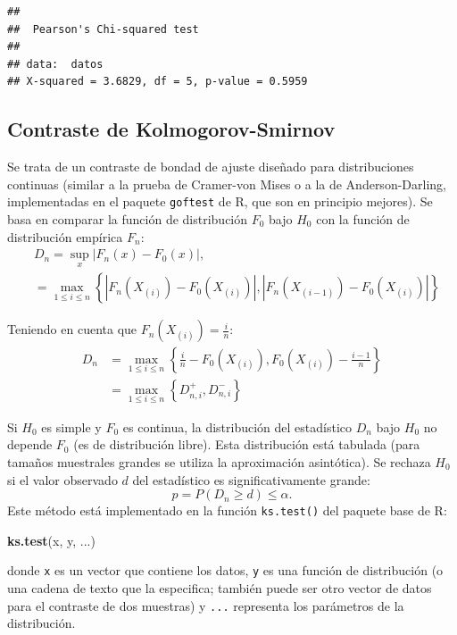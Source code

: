 \documentclass[
]{book}
\newenvironment{Shaded}{\begin{snugshade}}{\end{snugshade}}
\newcommand{\KeywordTok}[1]{\textcolor[rgb]{0.13,0.29,0.53}{\textbf{#1}}}
\newcommand{\NormalTok}[1]{#1}
\theoremstyle{break}
\theoremstyle{definition}
\theoremstyle{definition}
\theoremstyle{definition}
\theoremstyle{remark}
\begin{document}
\begin{verbatim}
## 
##  Pearson's Chi-squared test
## 
## data:  datos
## X-squared = 3.6829, df = 5, p-value = 0.5959
\end{verbatim}

\hypertarget{ks-test}{%
\subsection{Contraste de Kolmogorov-Smirnov}\label{ks-test}}

Se trata de un contraste de bondad de ajuste diseñado para distribuciones continuas
(similar a la prueba de Cramer-von Mises o a la de Anderson-Darling, implementadas en el paquete \texttt{goftest} de R, que son en principio mejores).
Se basa en comparar la función de distribución \(F_0\) bajo \(H_0\) con la función de distribución empírica \(F_n\):
\[\begin{aligned}
& D_n=\sup_{x}|F_n(x)-F_0(x)|,\\
& = \max_{1 \leq i \leq n} \left\{ |F_n(X_{(i)})-F_0(X_{(i)})|,|F_n(X_{(i-1)})-F_0(X_{(i)})| \right\}
\end{aligned}\]

Teniendo en cuenta que \(F_n\left( X_{(i)}\right) = \frac{i}n\):
\[\begin{aligned}
D_n  & =\max_{1\leq i\leq n}\left \{  \frac{i}n-F_0(X_{(i)}),F_0(X_{(i)})-\frac{i-1}n\right \} \\
& =\max_{1\leq i\leq n}\left \{  D_{n,i}^{+},D_{n,i}^{-}\right \}
\end{aligned}\]

Si \(H_0\) es simple y \(F_0\) es continua, la distribución del estadístico \(D_n\) bajo \(H_0\) no depende \(F_0\) (es de distribución libre).
Esta distribución está tabulada (para tamaños muestrales grandes se utiliza la aproximación asintótica).
Se rechaza \(H_0\) si el valor observado \(d\) del estadístico es significativamente grande:
\[p = P \left( D_n \geq d \right) \leq \alpha.\]
Este método está implementado en la función \texttt{ks.test()} del paquete base de R:

\begin{Shaded}
\begin{Highlighting}[]
\KeywordTok{ks.test}\NormalTok{(x, y, ...)}
\end{Highlighting}
\end{Shaded}

donde \texttt{x} es un vector que contiene los datos, \texttt{y} es una función de distribución
(o una cadena de texto que la especifica; también puede ser otro vector de datos
para el contraste de dos muestras) y \texttt{...} representa los parámetros de la distribución.
\end{document}
